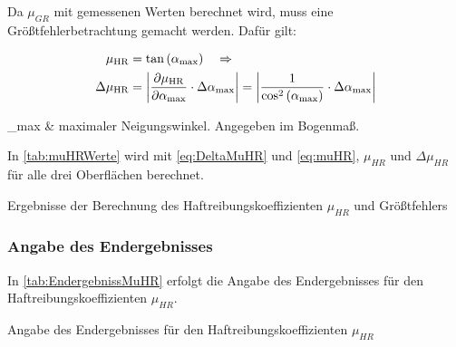 \newpage

Da $\mu_{GR}$ mit gemessenen Werten berechnet wird, muss eine Größtfehlerbetrachtung gemacht werden. Dafür gilt:


\begin{align}
\mu_{\mathrm{HR}} &=\tan \left(\alpha_{\max }\right) \quad \Rightarrow \nonumber \\
\Delta \mu_{\mathrm{HR}}&=\left|\frac{\partial \mu_{\mathrm{HR}}}{\partial \alpha_{\max }} \cdot \Delta \alpha_{\max }\right|=\abs*{\frac{1}{\cos ^{2}\left(\alpha_{\max }\right)} \cdot \Delta \alpha_{\max }} \label{eq:DeltaMuHR}
\end{align}
\begin{conditions}
\alpha_{max} & maximaler Neigungswinkel. Angegeben im Bogenmaß.
\end{conditions}

In \autoref{tab:muHRWerte} wird mit \autoref{eq:DeltaMuHR} und \autoref{eq:muHR}, $\mu_{HR}$ und $\Delta \mu_{HR}$ für alle drei Oberflächen berechnet.

\begin{table}[h]
  \center 
  \caption[Haftreibungskoeffizienten und Größtfehler]{Ergebnisse der Berechnung des Haftreibungskoeffizienten $\mu_{HR}$ und Größtfehlers}
  
  \label{tab:muHRWerte}
\end{table}

\subsubsection{Angabe des Endergebnisses}

In \autoref{tab:EndergebnissMuHR} erfolgt die Angabe des Endergebnisses für den Haftreibungskoeffizienten $\mu_{HR}$.

\begin{table}[h]
  \center 
  \caption[Endergebnisse des Haftreibungskoeffizienten]{Angabe des Endergebnisses für den Haftreibungskoeffizienten $\mu_{HR}$}
  
  \label{tab:EndergebnissMuHR}
\end{table}